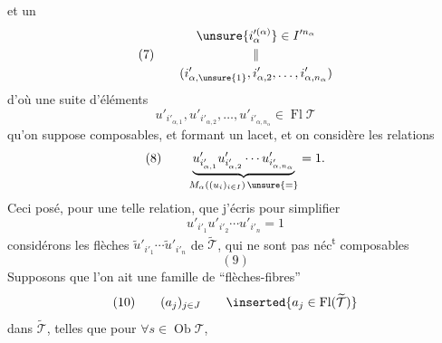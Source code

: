 et un
\[(7)\qquad\begin{gathered}\unsure{i'^{(\alpha)}_\alpha}\in I'^{n_\alpha}\\\Vert\\(i'_{\alpha,\unsure{1}},i'_{\alpha,2},\ldots,i'_{\alpha,n_\alpha})\end{gathered}\]
d'où une suite d'éléments
\[u'_{i'_{\alpha,1}},u'_{i'_{\alpha,2}},\ldots,u'_{i'_{\alpha,n_\alpha}}\in\operatorname{Fl}\mathcal T\]
qu'on suppose composables,  et formant un lacet,  et on considère les relations
\[(8)\qquad\underbrace{u'_{i'_{\alpha,1}}u'_{i'_{\alpha,2}}\cdots u'_{i'_{\alpha,n_\alpha}}}_{M_\alpha((u_i)_{i\in I})\,\unsure{=}}=1.\]
Ceci posé, pour une telle relation,
que j'écris pour simplifier
\[u'_{i'_1}u'_{i'_2}\cdots u'_{i'_n}=1\]
considérons les flèches 
$\widetilde u'_{i'_1}\cdots\widetilde u'_{i'_n}$ de $\widetilde{\mathcal T}$, qui ne sont pas néc\textsuperscript{t} composables
\[(9)\]
Supposons que l'on ait une famille de ``flèches-fibres'' 
\[(10)\qquad(a_j)_{j\in J}\qquad\inserted{a_j\in\operatorname{Fl}(\widetilde{\mathcal T})}\]
dans $\widetilde{\mathcal T}$, telles que pour $\forall s\in\operatorname{Ob}\mathcal T$,
